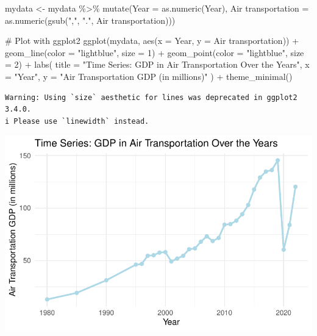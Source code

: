 \documentclass[
  letterpaper,
  DIV=11,
  numbers=noendperiod]{scrreprt}
\newenvironment{Shaded}{\begin{snugshade}}{\end{snugshade}}
\newcommand{\AttributeTok}[1]{\textcolor[rgb]{0.40,0.45,0.13}{#1}}
\newcommand{\CommentTok}[1]{\textcolor[rgb]{0.37,0.37,0.37}{#1}}
\newcommand{\DecValTok}[1]{\textcolor[rgb]{0.68,0.00,0.00}{#1}}
\newcommand{\FunctionTok}[1]{\textcolor[rgb]{0.28,0.35,0.67}{#1}}
\newcommand{\NormalTok}[1]{\textcolor[rgb]{0.00,0.23,0.31}{#1}}
\newcommand{\OtherTok}[1]{\textcolor[rgb]{0.00,0.23,0.31}{#1}}
\newcommand{\SpecialCharTok}[1]{\textcolor[rgb]{0.37,0.37,0.37}{#1}}
\newcommand{\StringTok}[1]{\textcolor[rgb]{0.13,0.47,0.30}{#1}}
\begin{document}
\begin{Shaded}
\begin{Highlighting}[]
\NormalTok{mydata }\OtherTok{\textless{}{-}}\NormalTok{ mydata }\SpecialCharTok{\%\textgreater{}\%}
  \FunctionTok{mutate}\NormalTok{(}\AttributeTok{Year =} \FunctionTok{as.numeric}\NormalTok{(Year),}
         \StringTok{\textasciigrave{}}\AttributeTok{Air transportation}\StringTok{\textasciigrave{}} \OtherTok{=} \FunctionTok{as.numeric}\NormalTok{(}\FunctionTok{gsub}\NormalTok{(}\StringTok{","}\NormalTok{, }\StringTok{"."}\NormalTok{, }\StringTok{\textasciigrave{}}\AttributeTok{Air transportation}\StringTok{\textasciigrave{}}\NormalTok{)))}

\CommentTok{\# Plot with ggplot2}
\FunctionTok{ggplot}\NormalTok{(mydata, }\FunctionTok{aes}\NormalTok{(}\AttributeTok{x =}\NormalTok{ Year, }\AttributeTok{y =} \StringTok{\textasciigrave{}}\AttributeTok{Air transportation}\StringTok{\textasciigrave{}}\NormalTok{)) }\SpecialCharTok{+}
  \FunctionTok{geom\_line}\NormalTok{(}\AttributeTok{color =} \StringTok{"lightblue"}\NormalTok{, }\AttributeTok{size =} \DecValTok{1}\NormalTok{) }\SpecialCharTok{+}
  \FunctionTok{geom\_point}\NormalTok{(}\AttributeTok{color =} \StringTok{"lightblue"}\NormalTok{, }\AttributeTok{size =} \DecValTok{2}\NormalTok{) }\SpecialCharTok{+}
  \FunctionTok{labs}\NormalTok{(}
    \AttributeTok{title =} \StringTok{"Time Series: GDP in Air Transportation Over the Years"}\NormalTok{,}
    \AttributeTok{x =} \StringTok{"Year"}\NormalTok{,}
    \AttributeTok{y =} \StringTok{"Air Transportation GDP (in millions)"}
\NormalTok{  ) }\SpecialCharTok{+}
  \FunctionTok{theme\_minimal}\NormalTok{()}
\end{Highlighting}
\end{Shaded}

\begin{verbatim}
Warning: Using `size` aesthetic for lines was deprecated in ggplot2 3.4.0.
i Please use `linewidth` instead.
\end{verbatim}

\includegraphics{FinalProject_Abigail_files/figure-pdf/unnamed-chunk-2-1.pdf}
\end{document}
